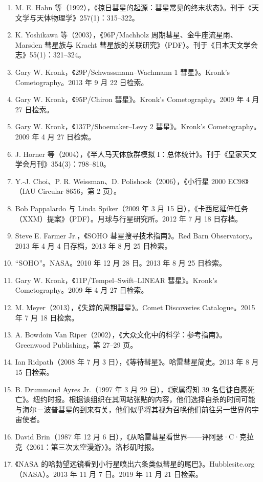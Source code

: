 \begin{enumerate}
\item M. E. Hahn 等（1992），《掠日彗星的起源：彗星常见的终末状态》。刊于《天文学与天体物理学》257(1)：315–322。
\item K. Yoshikawa 等（2003），《96P/Machholz 周期彗星、金牛座流星雨、Marsden 彗星族与 Kracht 彗星族的关联研究》（PDF）。刊于《日本天文学会志》55(1)：321–324。
\item Gary W. Kronk，《29P/Schwassmann–Wachmann 1 彗星》。Kronk’s Cometography。2013 年 9 月 22 日检索。
\item Gary W. Kronk，《95P/Chiron 彗星》。Kronk’s Cometography。2009 年 4 月 27 日检索。
\item Gary W. Kronk，《137P/Shoemaker–Levy 2 彗星》。Kronk’s Cometography。2009 年 4 月 27 日检索。
\item J. Horner 等（2004），《半人马天体族群模拟 I：总体统计》。刊于《皇家天文学会月刊》354(3)：798–810。
\item Y.-J. Choi、P. R. Weissman、D. Polishook（2006），《小行星 2000 EC98》（IAU Circular 8656，第 2 页）。
\item Bob Pappalardo 与 Linda Spiker（2009 年 3 月 15 日），《卡西尼延伸任务（XXM）提案》（PDF）。月球与行星研究所。2012 年 7 月 18 日存档。
\item Steve E. Farmer Jr.，《SOHO 彗星搜寻技术指南》。Red Barn Observatory。2013 年 4 月 4 日存档，2013 年 8 月 25 日检索。
\item “SOHO”。NASA。2010 年 12 月 28 日。2013 年 8 月 25 日检索。
\item Gary W. Kronk，《11P/Tempel–Swift–LINEAR 彗星》。Kronk’s Cometography。2009 年 4 月 27 日检索。
\item M. Meyer（2013），《失踪的周期彗星》。Comet Discoveries Catalogue。2015 年 7 月 18 日检索。
\item A. Bowdoin Van Riper（2002），《大众文化中的科学：参考指南》。Greenwood Publishing，第 27–29 页。
\item Ian Ridpath（2008 年 7 月 3 日），《等待彗星》。哈雷彗星简史。2013 年 8 月 15 日检索。
\item B. Drummond Ayres Jr.（1997 年 3 月 29 日），《家属得知 39 名信徒自愿死亡》。纽约时报。根据该组织在其网站张贴的内容，他们选择自杀的时间可能与海尔－波普彗星的到来有关，他们似乎将其视为召唤他们前往另一世界的宇宙使者。
\item David Brin（1987 年 12 月 6 日），《从哈雷彗星看世界——评阿瑟·C·克拉克〈2061：第三次太空漫游〉》。洛杉矶时报。
\item 《NASA 的哈勃望远镜看到小行星喷出六条类似彗星的尾巴》。Hubblesite.org（NASA）。2013 年 11 月 7 日。2019 年 11 月 21 日检索。
\end{enumerate}
